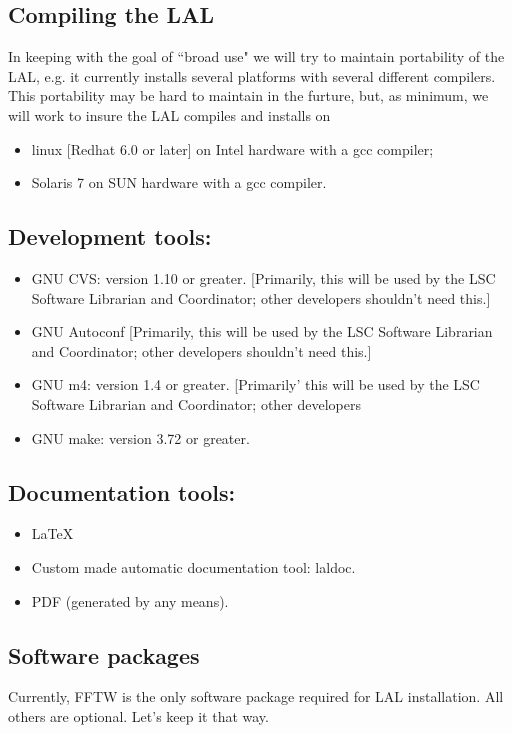 \documentclass[]{ligodcc}
\begin{document}
\subsection{Compiling the LAL}

In keeping with the goal of ``broad use" we will try to maintain
portability of the LAL, e.g. it currently installs several platforms
with several different compilers.  This portability may be hard to
maintain in the furture, but, as minimum, we will work to insure the
LAL compiles and installs on 

\begin{itemize}
\item
linux [Redhat 6.0 or later] on Intel hardware with a gcc compiler;
\item
Solaris 7 on SUN hardware with a gcc compiler.
\end{itemize}

\subsection{Development tools:}

\begin{itemize}
\item
GNU CVS: version 1.10 or greater. [Primarily, this will be
used by the LSC Software Librarian and Coordinator; other developers
shouldn't need this.]
\item
GNU Autoconf [Primarily, this will be used by the LSC Software
Librarian and Coordinator; other developers shouldn't need this.]
\item
GNU m4: version 1.4 or greater. [Primarily' this will be used
by the LSC Software Librarian and Coordinator; other developers
\item
GNU make: version 3.72 or greater.
\end{itemize}


\subsection{Documentation tools:}
\begin{itemize}
   \item
   LaTeX
   \item
   Custom made automatic documentation tool: laldoc.
   \item
   PDF (generated by any means).
\end{itemize}


\subsection{Software packages}
Currently, FFTW is the only software package required for LAL
installation. All others are optional. Let's keep it  that way.
\end{document}
